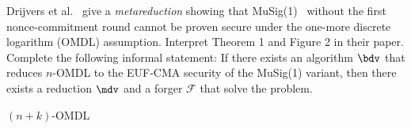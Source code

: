 \begin{exercise}[Optional]
  Drijvers et al.~\cite{SP:DEFKLN19} give a \emph{metareduction} showing that MuSig(1)~\cite{DCC:MPSW19} without the first nonce-commitment round cannot be proven secure under the one-more discrete logarithm (OMDL) assumption.
  Interpret Theorem 1 and Figure 2 in their paper.
  Complete the following informal statement: If there exists an algorithm $\bdv$ that reduces $n$-OMDL to the EUF-CMA security of the MuSig(1) variant, then there exists a reduction $\mdv$ and a forger $\mathcal{F}$ that solve the \underline{\hspace{3cm}} problem.
\end{exercise}

\ifsolutions
\begin{mysolution}
  $(n + k)$-OMDL
\end{mysolution}
\fi
